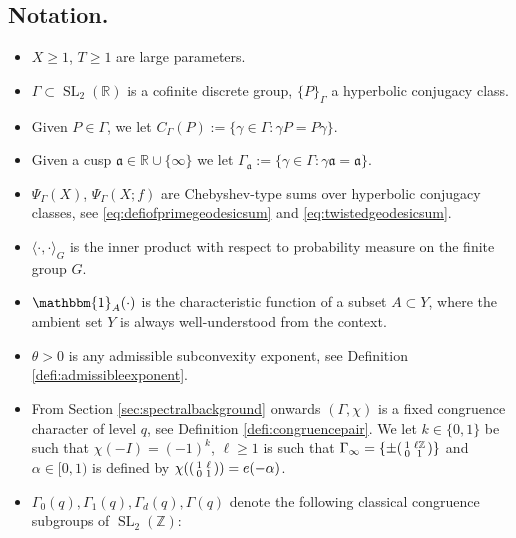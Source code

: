 \documentclass{article}
\theoremstyle{named}
\newcommand{\Z}{\mathbb{Z}}
\newcommand{\R}{\mathbb{R}}
\renewcommand{\a}{\mathfrak{a}}
\DeclareMathOperator{\SL}{SL}
\begin{document}
\subsection{Notation.}
\begin{itemize}
    \item $X \geq 1$, $T \geq 1$ are large parameters.
    \item $\Gamma \subset \SL_2(\R)$ is a cofinite discrete group, $\{P\}_\Gamma$ a hyperbolic conjugacy class.
    \item Given $P \in \Gamma$, we let $C_\Gamma(P):= \{\gamma \in \Gamma: \gamma P = P \gamma\}$.
    \item Given a cusp $\a \in \R \cup \{\infty\}$ we let $\Gamma_\a := \{\gamma \in \Gamma : \gamma \a = \a\}$.
    \item $\Psi_\Gamma(X)$, $\Psi_\Gamma(X; f)$ are Chebyshev-type sums over hyperbolic conjugacy classes, see \eqref{eq:defiofprimegeodesicsum} and \eqref{eq:twistedgeodesicsum}.
    \item $\langle \cdot, \cdot \rangle_G$ is the inner product with respect to probability measure on the finite group $G$. 
    \item $\mathbbm{1}_{A}(\cdot)$ is the characteristic function of a subset $A \subset Y$, where the ambient set $Y$ is always well-understood from the context.
    \item $\theta > 0$ is any admissible subconvexity exponent, see Definition \ref{defi:admissibleexponent}.
    \item From Section \ref{sec:spectralbackground} onwards $(\Gamma, \chi)$ is a fixed congruence character of level $q$, see Definition \ref{defi:congruencepair}. We let $k \in \{0, 1\}$ be such that $\chi(-I) = (-1)^k$, $\ell \geq 1$ is such that $\Gamma_\infty = \{\pm \begin{psmallmatrix}
        1 & \ell \Z\\
        0 & 1
    \end{psmallmatrix}\}$ and $\alpha \in [0, 1)$ is defined by $\chi(\begin{psmallmatrix}
        1 & \ell\\
        0 & 1
    \end{psmallmatrix}) = e(-\alpha)$.
    \item $\Gamma_0(q), \Gamma_1(q), \Gamma_d(q), \Gamma(q)$ denote the following classical congruence subgroups of $\SL_2(\Z)$:

\end{itemize}
\end{document}
